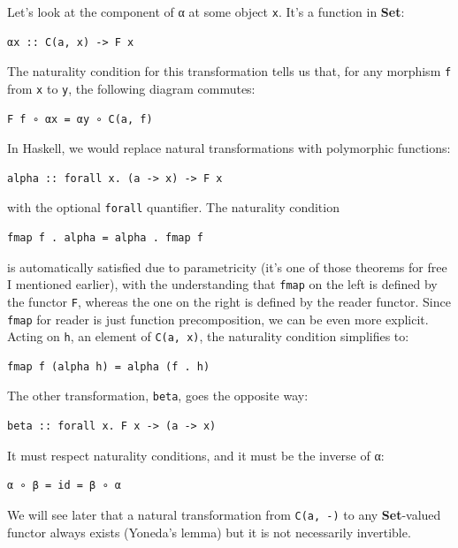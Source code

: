 Let's look at the component of α at some object \texttt{x}. It's a
function in \textbf{Set}:

\begin{verbatim}
αx :: C(a, x) -> F x
\end{verbatim}

The naturality condition for this transformation tells us that, for any
morphism \texttt{f} from \texttt{x} to \texttt{y}, the following diagram
commutes:

\begin{verbatim}
F f ∘ αx = αy ∘ C(a, f)
\end{verbatim}

In Haskell, we would replace natural transformations with polymorphic
functions:

\begin{verbatim}
alpha :: forall x. (a -> x) -> F x
\end{verbatim}

with the optional \texttt{forall} quantifier. The naturality condition

\begin{verbatim}
fmap f . alpha = alpha . fmap f
\end{verbatim}

is automatically satisfied due to parametricity (it's one of those
theorems for free I mentioned earlier), with the understanding that
\texttt{fmap} on the left is defined by the functor \texttt{F}, whereas
the one on the right is defined by the reader functor. Since
\texttt{fmap} for reader is just function precomposition, we can be even
more explicit. Acting on \texttt{h}, an element of \texttt{C(a,\ x)},
the naturality condition simplifies to:

\begin{verbatim}
fmap f (alpha h) = alpha (f . h)
\end{verbatim}

The other transformation, \texttt{beta}, goes the opposite way:

\begin{verbatim}
beta :: forall x. F x -> (a -> x)
\end{verbatim}

It must respect naturality conditions, and it must be the inverse of α:

\begin{verbatim}
α ∘ β = id = β ∘ α
\end{verbatim}

We will see later that a natural transformation from \texttt{C(a,\ -)}
to any \textbf{Set}-valued functor always exists (Yoneda's lemma) but it
is not necessarily invertible.

